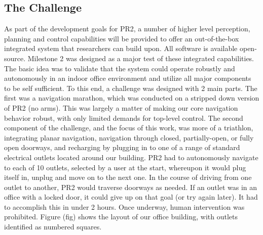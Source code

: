 \documentclass[letterpaper]{article}
\begin{document}
\subsection{The Challenge}
As part of the development goals for PR2, a number of higher level perception, planning and control capabilities will be provided to offer an out-of-the-box integrated system that researchers can build upon. All software is available open-source. Milestone 2 was designed as a major test of these integrated capabilities. The basic idea was to validate that the system could operate robustly and autonomously in an indoor office environment and utilize all major components to be self sufficient. To this end, a challenge was designed with 2 main parts. The first was a navigation marathon, which was conducted on a stripped down version of PR2 (no arms). This was largely a matter of making our core navigation behavior robust, with only limited demands for top-level control. The second component of the challenge, and the focus of this work, was more of a triathlon, integrating planar navigation, navigation through closed, partially-open, or fully open doorways, and recharging by plugging in to one of a range of standard electrical outlets located around our building. PR2 had to autonomously navigate to each of 10 outlets, selected by a user at the start, whereupon it would plug itself in, unplug and move on to the next one. In the course of driving from one outlet to another, PR2 would traverse doorways as needed. If an outlet was in an office with a locked door, it could give up on that goal (or try again later). It had to accomplish this in under 2 hours. Once underway, human intervention was prohibited. Figure (fig) shows the layout of our office building, with outlets identified as numbered squares.
\end{document}
